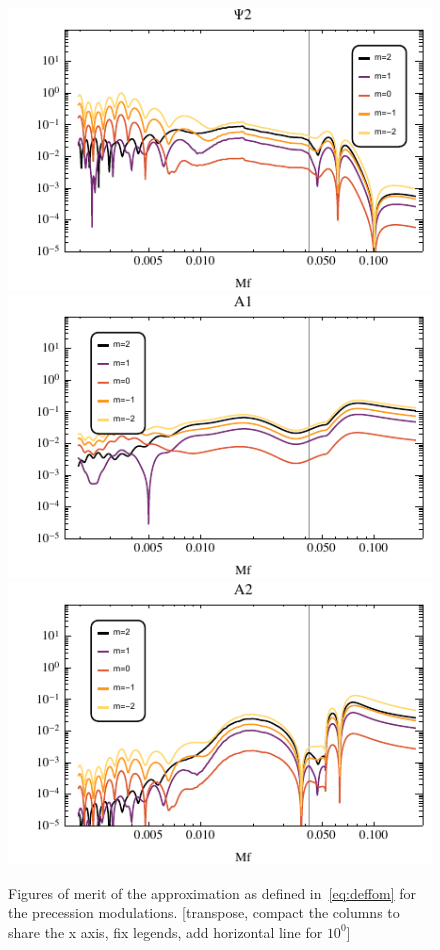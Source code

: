 \documentclass[aps,showpacs,twocolumn,
prd,superscriptaddress,nofootinbib]{revtex4-1}
\newcommand{\SM}[1]{{\color{Red} #1}}
\begin{document}
\begin{figure}
  \includegraphics[width=.32\linewidth]{plots/fom_--_Psi2.pdf}
  \hspace{0cm}
  \includegraphics[width=.32\linewidth]{plots/fom_--_A1.pdf}
  \hspace{0cm}
  \includegraphics[width=.32\linewidth]{plots/fom_--_A2.pdf}
  \caption{Figures of merit of the approximation as defined in~\eqref{eq:deffom} for the precession modulations. \SM{[transpose, compact the columns to share the x axis, fix legends, add horizontal line for $10^{0}$]}}
  \label{fig:fomprec}
\end{figure}

\end{document}
